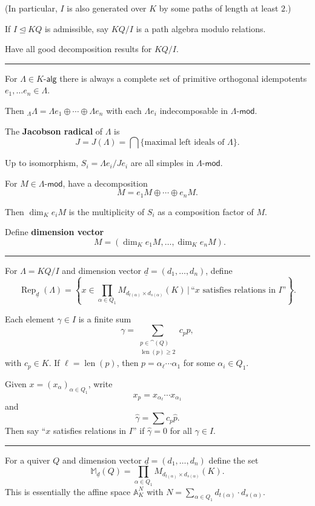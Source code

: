 \documentclass[12pt]{article}
\newcommand{\keyword}[1]{\textbf{#1}}
\newcommand{\sepline}{\rule{\textwidth}{0.4pt}}
\theoremstyle{definition}
\newcommand{\A}{\mathbb{A}}
\newcommand{\M}{\mathbb{M}}
\newcommand{\<}{\langle}
\renewcommand{\>}{\rangle}
\newcommand{\teq}{\trianglelefteq}
\newcommand{\dd}{{\underline{d}}}
\DeclareMathOperator{\Dim}{\underline{dim}}
\DeclareMathOperator{\Rep}{Rep}
\DeclareMathOperator{\len}{len}
\newcommand{\mathcat}{\mathsf}
\renewcommand{\mod}{\mathsf{\text{-}mod}}
\renewcommand{\_}[1]{{_{#1}}}
\begin{document}
(In particular, $I$ is also generated over $K$ by some paths of length at least $2$.)

If $I \teq KQ$ is admissible, say $KQ/I$ is a path algebra modulo relations.

Have all good decomposition results for $KQ/I$.

\sepline

For $\Lambda \in K\mathcat{\text{-}alg}$ there is always a complete set of primitive orthogonal idempotents $e_1, \dots e_n \in \Lambda$.

Then $\_\Lambda\Lambda = \Lambda e_1 \oplus \cdots \oplus \Lambda e_n$ with each $\Lambda e_i$ indecomposable in $\Lambda\mod$.

The \keyword{Jacobson radical} of $\Lambda$ is 
\[
    J = J(\Lambda) = \bigcap\{\text{maximal left ideals of $\Lambda$}\}.
\]

Up to isomorphism, $S_i = \Lambda e_i / Je_i$ are all simples in $\Lambda\mod$.

For $M \in \Lambda\mod$, have a decomposition
\[
    M = e_1 M \oplus \cdots \oplus e_n M.
\]

Then $\dim_K e_i M$ is the multiplicity of $S_i$ as a composition factor of $M$.

Define \keyword{dimension vector}
\[
    \Dim M = (\dim_K e_1 M, \dots, \dim_K e_n M).
\]

\sepline

For $\Lambda = KQ/I$ and dimension vector $\dd = (d_1, \dots, d_n)$, define
\[
    \Rep_\dd(\Lambda) = \left\{
        x \in \prod_{\alpha \in Q_1} M_{d_{t(\alpha)} \times d_{s(\alpha)}}(K)
        \,\bigg|\,
        \text{``$x$ satisfies relations in $I$''}
    \right\}.
\] 

Each element $\gamma \in I$ is a finite sum
\[
    \gamma = \sum_{\substack{p \in \cat(Q) \\ \len(p) \geq 2}} c_p p,
\]
with $c_p \in K$.
If $\ell = \len(p)$, then $p = \alpha_\ell \cdots \alpha_1$ for some $\alpha_i \in Q_1$.

Given $x = (x_\alpha)_{\alpha \in Q_1}$, write
\[
    x_p = x_{\alpha_\ell} \cdots x_{\alpha_1}
\]
and
\[
    \hat{\gamma} = \sum c_p \hat{p}.
\]
Then say ``$x$ satisfies relations in $I$'' if $\hat{\gamma} = 0$ for all $\gamma \in I$.


\sepline

For a quiver $Q$ and dimension vector $\dd = (d_1, \dots, d_n)$ define the set
\[
    \M_\dd(Q)
        = \prod_{\alpha \in Q_1} M_{d_{t(\alpha)} \times d_{s(\alpha)}}(K).
\]
This is essentially the affine space $\A_K^{N}$ with $N = \sum_{\alpha \in Q_1} d_{t(\alpha)} \cdot d_{s(\alpha)}$.
\end{document}
